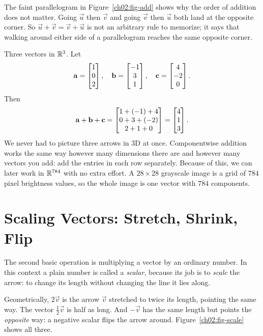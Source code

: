 \begin{intuitionbox}
The faint parallelogram in Figure~\ref{ch02:fig-add} shows why the order of addition
does not matter. Going $\vec{u}$ then $\vec{v}$ and going $\vec{v}$ then $\vec{u}$ both
land at the opposite corner. So $\vec{u}+\vec{v}=\vec{v}+\vec{u}$ is not an arbitrary
rule to memorize; it says that walking around either side of a parallelogram reaches the
same opposite corner.
\end{intuitionbox}

\begin{example}
\label{ch02:ex-add3}
Three vectors in $\mathbb{R}^3$. Let
\[
  \mathbf{a}=\begin{bmatrix}1\\0\\2\end{bmatrix},\quad
  \mathbf{b}=\begin{bmatrix}-1\\3\\1\end{bmatrix},\quad
  \mathbf{c}=\begin{bmatrix}4\\-2\\0\end{bmatrix}.
\]
Then
\[
  \mathbf{a}+\mathbf{b}+\mathbf{c}
  = \begin{bmatrix}1+(-1)+4 \\ 0+3+(-2) \\ 2+1+0\end{bmatrix}
  = \begin{bmatrix}4 \\ 1 \\ 3\end{bmatrix}.
\]
We never had to picture three arrows in 3D at once. Componentwise addition works the same
way however many dimensions there are and however many vectors you add: add the entries
in each row separately. Because of this, we can later work in $\mathbb{R}^{784}$ with no extra
effort. A $28\times 28$ grayscale image is a grid of $784$ pixel brightness values, so
the whole image is one vector with $784$ components.
\end{example}

\section{Scaling Vectors: Stretch, Shrink, Flip}
\label{ch02:scale}

The second basic operation is multiplying a vector by an ordinary number. In this
context a plain number is called a \emph{scalar}, because its job is to \emph{scale} the
arrow: to change its length without changing the line it lies along.

Geometrically, $2\vec{v}$ is the arrow $\vec{v}$ stretched to twice its length, pointing
the same way. The vector $\tfrac{1}{2}\vec{v}$ is half as long. And $-\vec{v}$ has the same
length but points the \emph{opposite} way: a negative scalar flips the arrow around.
Figure~\ref{ch02:fig-scale} shows all three.

